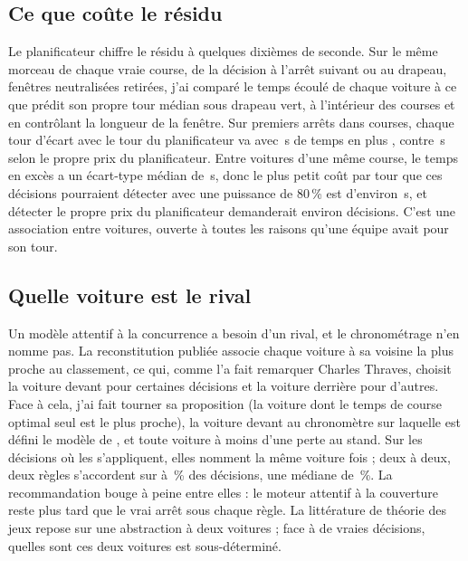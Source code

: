 \documentclass[11pt,a4paper]{article}
\begin{document}
\subsection{Ce que coûte le résidu}
\label{sec:deviationcost}

Le planificateur chiffre le résidu à quelques dixièmes de seconde. Sur le même
morceau de chaque vraie course, de la décision à l'arrêt suivant ou au drapeau,
fenêtres neutralisées retirées, j'ai comparé le temps écoulé de chaque voiture à
ce que prédit son propre tour médian sous drapeau vert, à l'intérieur des courses
et en contrôlant la longueur de la fenêtre. Sur \NDeviationCars{} premiers arrêts
dans \NDeviationRaces{} courses, chaque tour d'écart avec le tour du
planificateur va avec \DeviationPerLap{}\,s de temps en plus
\DeviationPerLapCi{}, contre \DeviationPlannerPerLap{}\,s selon le propre prix du
planificateur. Entre voitures d'une même course, le temps en excès a un
écart-type médian de \DeviationSpread{}\,s, donc le plus petit coût par tour que
ces décisions pourraient détecter avec une puissance de 80\,\% est d'environ
\DeviationMde{}\,s, et détecter le propre prix du planificateur demanderait
environ \DeviationNeeded{} décisions. C'est une association entre voitures,
ouverte à toutes les raisons qu'une équipe avait pour son tour.

\subsection{Quelle voiture est le rival}
\label{sec:rivalchoice}

Un modèle attentif à la concurrence a besoin d'un rival, et le chronométrage
n'en nomme pas. La reconstitution publiée associe chaque voiture à sa voisine la
plus proche au classement, ce qui, comme l'a fait remarquer Charles Thraves,
choisit la voiture devant pour certaines décisions et la voiture derrière pour
d'autres. Face à cela, j'ai fait tourner sa proposition (la voiture dont le temps
de course optimal seul est le plus proche), la voiture devant au chronomètre sur
laquelle est défini le modèle de \citet{salminen2026}, et toute voiture à moins
d'une perte au stand. Sur les \NRivalAllApply{} décisions où les \NRivalRules{}
s'appliquent, elles nomment la même voiture \NRivalAllAgree{} fois ; deux à deux,
deux règles s'accordent sur \RivalPairMin{} à \RivalPairMax{}\,\% des décisions,
une médiane de \RivalPairMedian{}\,\%. La recommandation bouge à peine entre
elles : le moteur attentif à la couverture reste plus tard que le vrai arrêt sous
chaque règle. La littérature de théorie des jeux repose sur une abstraction à
deux voitures \citep{aguad2024,devries2026,salminen2026} ; face à de vraies
décisions, quelles sont ces deux voitures est sous-déterminé.
\end{document}
